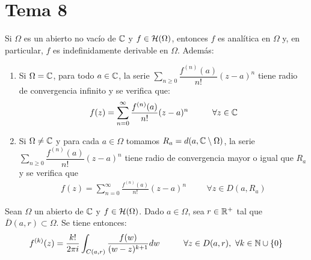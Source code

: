\documentclass[12pt]{article}
\begin{document}
    \section{Tema 8}
    \begin{teo}
        Si $\Omega$ es un abierto no vacío de $\mathbb{C}$ y $f\in \mathcal{H}(\Omega)$, entonces $f$ es analítica en $\Omega$ y, en particular, $f$ es indefinidamente derivable en $\Omega$. Además:
        \begin{enumerate}
            \item Si $\Omega = \mathbb{C}$, para todo $a\in \mathbb{C}$, la serie $\sum\limits_{n\geq 0} \dfrac{f^{(n)}(a)}{n!}(z-a)^n$ tiene radio de convergencia infinito y se verifica que:
            \begin{gather*}
                f(z) = \sum\limits_{n=0}^\infty \frac{f^{(n)}(a)}{n!} (z-a)^n \hspace{1cm} \forall z \in \mathbb{C}
            \end{gather*}
            \item Si $\Omega \neq \mathbb{C}$ y para cada $a\in \Omega$ tomamos $R_a = d(a,\mathbb{C}\setminus \Omega)$, la serie $\sum\limits_{n\geq 0} \dfrac{f^{(n)}(a)}{n!}(z-a)^n$ tiene radio de convergencia mayor o igual que $R_a$ y se verifica que 
            \begin{gather*}
                f(z) = \sum\limits_{n=0}^\infty \frac{f^{(n)}(a)}{n!} (z-a)^n \hspace{1cm} \forall z \in D(a, R_a)
            \end{gather*}
        \end{enumerate}
    \end{teo}

    \begin{prop} Sean $\Omega$ un abierto de $\mathbb{C}$ y $f\in \mathcal{H}(\Omega)$. Dado $a\in \Omega$, sea $r\in \mathbb{R}^+$ tal que $\overline{D}(a,r)\subset \Omega$. Se tiene entonces:
        \begin{gather*}
            f^{(k)} (z) = \frac{k!}{2\pi i } \int_{C(a,r)} \frac{f(w)}{(w-z)^{k+1}} dw \hspace{1cm} \forall z \in D(a,r),\ \forall k \in \mathbb{N}\cup \{0\}
        \end{gather*}
    \end{prop}
\end{document}
